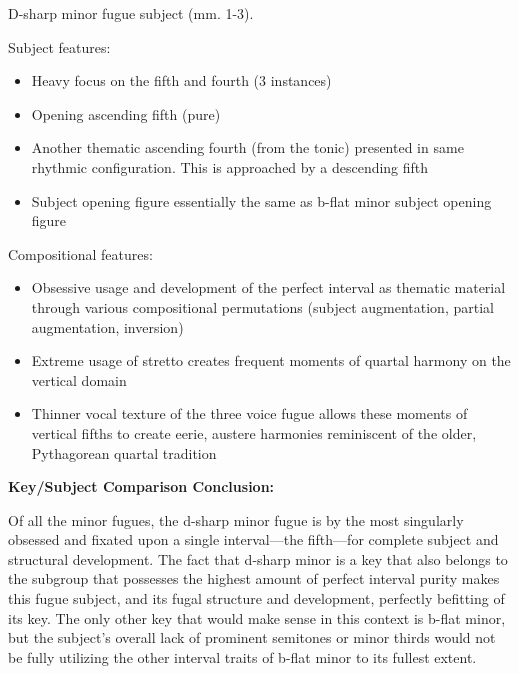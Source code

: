 \begin{Example}[H]
    \begin{center}
    \caption{ D-sharp minor fugue subject (mm. 1-3). }
    \end{center}
\end{Example}
    

    \begin{center}
    \end{center}
    
    Subject features:

\begin{itemize}
\tightlist
\item
  Heavy focus on the fifth and fourth (3 instances)
\item
  Opening ascending fifth (pure)
\item
  Another thematic ascending fourth (from the tonic) presented in same
  rhythmic configuration. This is approached by a descending fifth
\item
  Subject opening figure essentially the same as b-flat minor subject
  opening figure
\end{itemize}

Compositional features:

\begin{itemize}
\tightlist
\item
  Obsessive usage and development of the perfect interval as thematic
  material through various compositional permutations (subject
  augmentation, partial augmentation, inversion)
\item
  Extreme usage of stretto creates frequent moments of quartal harmony
  on the vertical domain
\item
  Thinner vocal texture of the three voice fugue allows these moments of
  vertical fifths to create eerie, austere harmonies reminiscent of the
  older, Pythagorean quartal tradition
\end{itemize}

\textbf{Key/Subject Comparison Conclusion:}

Of all the minor fugues, the d-sharp minor fugue is by the most
singularly obsessed and fixated upon a single interval---the
fifth---for complete subject and structural development. The fact
that d-sharp minor is a key that also belongs to the subgroup that
possesses the highest amount of perfect interval purity makes this fugue
subject, and its fugal structure and development, perfectly befitting of
its key. The only other key that would make sense in this context is
b-flat minor, but the subject's overall lack of prominent semitones or
minor thirds would not be fully utilizing the other interval traits of
b-flat minor to its fullest extent.

